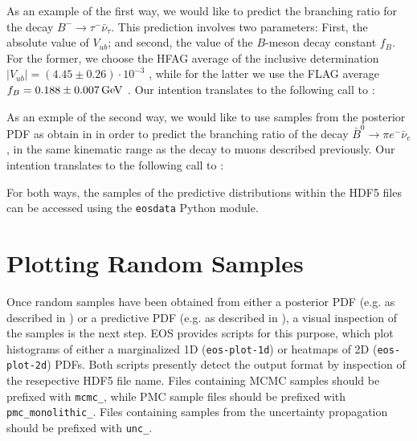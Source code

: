 As an example of the first way, we would like to predict the branching
ratio for the decay $B^- \to \tau^- \bar{\nu}_\tau$. This prediction involves
two parameters: First, the absolute value of $V_{ub}$; and second, the value
of the $B$-meson decay constant $f_{B}$. For the former, we choose the
HFAG average of the inclusive determination $|V_{ub}| = (4.45 \pm 0.26) \cdot 10^{-3}$
\cite{Amhis:2014hma}, while for the latter we use the FLAG average
$f_{B} = 0.188 \pm 0.007\,\mathrm{GeV}$ \cite{Aoki:2013ldr}.
Our intention translates to the following call to :

As an exmple of the second way, we would like to use samples from the posterior
PDF as obtain in  in order to predict the
branching ratio of the decay $\bar{B}^0\to \pi e^- \bar{\nu}_e$, in the
same kinematic range as the decay to muons described previously.
Our intention translates to the following call to :

For both ways, the samples of the predictive distributions within the HDF5 files
can be accessed using the \texttt{eosdata} Python module.

\section{Plotting Random Samples}
\label{sec:usage:eos-plot}

Once random samples have been obtained from either a posterior PDF (e.g. as
described in ) or a predictive PDF (e.g. as
described in ), a visual inspection of
the samples is the next step.  EOS provides scripts for this purpose, which
plot histograms of either a marginalized 1D (\texttt{eos-plot-1d}) or heatmaps
of 2D (\texttt{eos-plot-2d}) PDFs.  Both scripts presently detect the output
format by inspection of the resepective HDF5 file name. Files containing MCMC
samples should be prefixed with \texttt{mcmc\_}, while PMC sample files should
be prefixed with \texttt{pmc\_monolithic\_}. Files containing samples from the
uncertainty propagation should be prefixed with \texttt{unc\_}.

